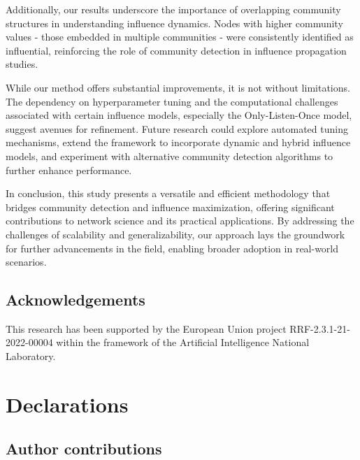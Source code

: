 \documentclass[pdflatex,sn-mathphys-ay]{sn-jnl}
\begin{document}
Additionally, our results underscore the importance of overlapping community structures in understanding influence dynamics. Nodes with higher community values - those embedded in multiple communities - were consistently identified as influential, reinforcing the role of community detection in influence propagation studies.

While our method offers substantial improvements, it is not without limitations. The dependency on hyperparameter tuning and the computational challenges associated with certain influence models, especially the Only-Listen-Once model, suggest avenues for refinement. Future research could explore automated tuning mechanisms, extend the framework to incorporate dynamic and hybrid influence models, and experiment with alternative community detection algorithms to further enhance performance.

In conclusion, this study presents a versatile and efficient methodology that bridges community detection and influence maximization, offering significant contributions to network science and its practical applications. By addressing the challenges of scalability and generalizability, our approach lays the groundwork for further advancements in the field, enabling broader adoption in real-world scenarios.


\subsection*{Acknowledgements}\label{subsec_acknowledgements}

This research has been supported by the European Union project RRF-2.3.1-21-2022-00004 within the framework of the Artificial Intelligence National Laboratory.


\section*{Declarations}\label{sec_declarations}


\subsection*{Author contributions}\label{subsec_contributions}
\end{document}
